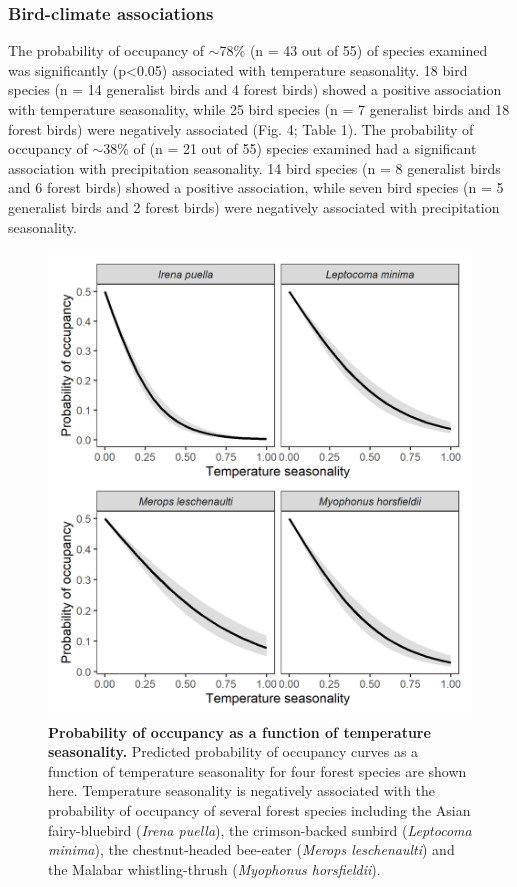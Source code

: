 \subsubsection*{Bird-climate associations}

The probability of occupancy of $\sim$78\% (n = 43 out of 55) of species examined was significantly (p<0.05) associated with temperature seasonality.
18 bird species (n = 14 generalist birds and 4 forest birds) showed a positive association with temperature seasonality, while 25 bird species (n = 7 generalist birds and 18 forest birds) were negatively associated (Fig.
4; Table 1).
The probability of occupancy of $\sim$38\% of (n = 21 out of 55) species examined had a significant association with precipitation seasonality.
14 bird species (n = 8 generalist birds and 6 forest birds) showed a positive association, while seven bird species (n = 5 generalist birds and 2 forest birds) were negatively associated with precipitation seasonality.

\begin{figure}
    \centering
    \includegraphics{figures/hillybirds/fig_05.png}
    \caption{
        \textbf{Probability of occupancy as a function of temperature seasonality.}
        Predicted probability of occupancy curves as a function of temperature seasonality for four forest species are shown here. 
        Temperature seasonality is negatively associated with the probability of occupancy of several forest species including the Asian fairy-bluebird (\textit{Irena puella}), the crimson-backed sunbird (\textit{Leptocoma minima}), the chestnut-headed bee-eater (\textit{Merops leschenaulti}) and the Malabar whistling-thrush (\textit{Myophonus horsfieldii}).
    }
    \label{hilly_fig_05}
\end{figure}

